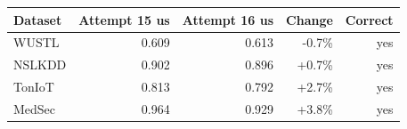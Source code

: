 \begin{tabular}{lrrrr}
\toprule
Dataset & Attempt 15 us & Attempt 16 us & Change & Correct \\
\midrule
WUSTL & 0.609 & 0.613 & -0.7\% & yes \\
NSLKDD & 0.902 & 0.896 & +0.7\% & yes \\
TonIoT & 0.813 & 0.792 & +2.7\% & yes \\
MedSec & 0.964 & 0.929 & +3.8\% & yes \\
\bottomrule
\end{tabular}
